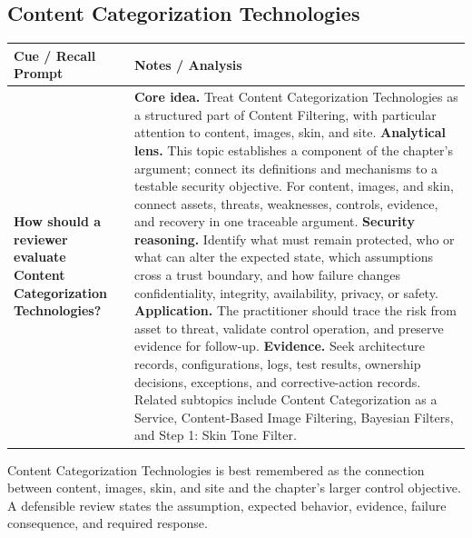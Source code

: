 \documentclass[11pt]{article}
\newcommand{\CornellHeader}{%
\rowcolor{Navy}\color{white}\bfseries Cue / Recall Prompt & \color{white}\bfseries Notes / Analysis\\\hline}
\newcommand{\CornellRow}[2]{%
\cellcolor{CueGray}\RaggedRight\textbf{#1} & \RaggedRight #2\\\hline}
\begin{document}
\subsection*{Content Categorization Technologies}
\begin{longtable}{>{\RaggedRight\arraybackslash}p{}|>{\RaggedRight\arraybackslash}p{}}
\CornellHeader
\CornellRow{How should a reviewer evaluate Content Categorization Technologies?}{\textbf{Core idea.} Treat Content Categorization Technologies as a structured part of Content Filtering, with particular attention to content, images, skin, and site. \textbf{Analytical lens.} This topic establishes a component of the chapter's argument; connect its definitions and mechanisms to a testable security objective. For content, images, and skin, connect assets, threats, weaknesses, controls, evidence, and recovery in one traceable argument. \textbf{Security reasoning.} Identify what must remain protected, who or what can alter the expected state, which assumptions cross a trust boundary, and how failure changes confidentiality, integrity, availability, privacy, or safety. \textbf{Application.} The practitioner should trace the risk from asset to threat, validate control operation, and preserve evidence for follow-up. \textbf{Evidence.} Seek architecture records, configurations, logs, test results, ownership decisions, exceptions, and corrective-action records. Related subtopics include Content Categorization as a Service, Content-Based Image Filtering, Bayesian Filters, and Step 1: Skin Tone Filter.}
\end{longtable}
\begin{topicsummary}
Content Categorization Technologies is best remembered as the connection between content, images, skin, and site and the chapter's larger control objective. A defensible review states the assumption, expected behavior, evidence, failure consequence, and required response.
\end{topicsummary}
\end{document}
